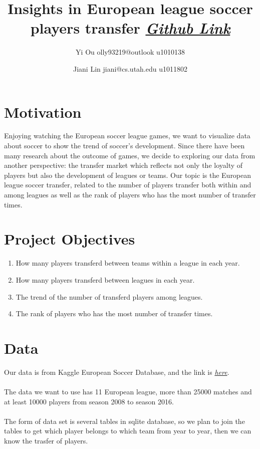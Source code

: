 \documentclass[11pt]{article}
\author{Yi Ou olly93219@outlook u1010138}
\date{Jiani Lin jiani@cs.utah.edu u1011802}
\title{Insights in European league soccer players transfer \emph{\href{http://github.com/SayingsOlly/dataviscourse-pr-insights-in-European-league-soccer-transfer}{Github Link}}}
\begin{document}
\maketitle
\tableofcontents


\section{Motivation}
\label{sec-1}
Enjoying watching the European soccer league games, we want to visualize data about soccer to show the trend of soccer's development.
Since there have been many research about the outcome of games, we decide to exploring our data from another perspective:
the transfer market which reflects not only the loyalty of players but also the development of leagues or teams. Our topic is the European league soccer transfer,
related to the number of players transfer both within and among leagues as well as the rank of players who has the most number of transfer times.

\section{Project Objectives}
\label{sec-2}
\begin{enumerate}
\item How many players transferd between teams within a league in each year.
\item How many players transferd between leagues in each year.
\item The trend of the number of transferd players among leagues.
\item The rank of players who has the most number of transfer times.
\end{enumerate}
\section{Data}
\label{sec-3}

Our data is from Kaggle European Soccer Database, and the link is \emph{\href{https://www.kaggle.com/hugomathien/soccer}{here}}.\\
\\
The data we want to use has 11 European league, more than 25000 matches and at least 10000 players from season 2008 to season 2016.\\
\\
The form of data set is several tables in sqlite database, so we plan to join the tables to get which player belongs to which team from year to year, then we can know the trasfer of players.\\
\end{document}
